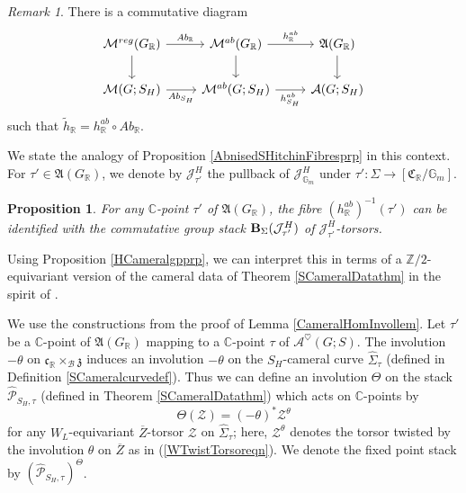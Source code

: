 \documentclass{amsart}
\newtheorem{proposition}[theorem]{Proposition}
\theoremstyle{remark}
\newtheorem{remark}[theorem]{Remark}
\numberwithin{theorem}{section}
\numberwithin{equation}{section}
\begin{document}
\begin{remark}\label{AbnsdGRHiggsrmk}
    There is a commutative diagram
        \begin{equation}\label{AbnsdGRHiggs2eqn}
\begin{tikzcd}
{\mathcal M^{reg}(G_{\mathbb{R}})} \arrow[r, " Ab_\mathbb{R}"] \arrow[d] & {\mathcal M^{ab}(G_{\mathbb{R}})} \arrow[r, "{h}^{ab}_{\mathbb{R}}"] \arrow[d] & {\mathfrak{ A}(G_{\mathbb{R}})} \arrow[d] \\
{\mathcal M(G;{S_H})} \arrow[r, "Ab_{S_H}"']                                             & {\mathcal M^{ab}(G;{S_H})} \arrow[r, "h_{S_H}^{ab}"']                                                   & {\mathcal A(G;S_H)}                
\end{tikzcd}
        \end{equation}
        such that $\tilde{h}_{\mathbb{R}} = { h}_{\mathbb{R}}^{ab} \circ { Ab}_{\mathbb{R}}$.
\end{remark}

We state the analogy of Proposition \ref{AbnisedSHitchinFibresprp} in this context. For $\tau' \in \mathfrak{ A}(G_\mathbb{R})$, we denote by $\mathcal J_{\tau'}^H$ the pullback of $\mathcal J^H_{\mathbb{G}_m}$ under $\tau':\Sigma \rightarrow [\mathfrak{C}_\mathbb{R}/\mathbb{G}_m]$.
\begin{proposition}\label{RealNonAbnAbnprp}
        For any $\mathbb{C}$-point $\tau'$ of $\mathfrak{ A}(G_{\mathbb{R}})$, the fibre $({h}_{\mathbb{R}}^{ab})^{-1}(\tau')$ can be identified with the commutative group stack ${\bf B}_{\Sigma}(\mathcal J^H_{\tau'})$ of $\mathcal J^H_{\tau'}$-torsors.
\end{proposition}

Using Proposition \ref{HCameralgpprp}, we can interpret this in terms of a $\mathbb{Z}/2$-equivariant version of the cameral data of Theorem \ref{SCameralDatathm} in the spirit of \cite[Section 5.2]{GPPN}. 

We use the constructions from the proof of Lemma \ref{CameralHomInvollem}. Let $\tau'$ be a $\mathbb{C}$-point of $\mathfrak{ A}(G_{\mathbb{R}})$ mapping to a $\mathbb{C}$-point $\tau$ of $\mathcal A^\heartsuit(G;S)$. The involution $-\theta$ on $\mathfrak{c}_\mathbb{R} \times_{\mathcal B} \mathfrak{z}$ induces an involution $-\theta$ on the $S_H$-cameral curve $\hat\Sigma_\tau$ (defined in Definition \ref{SCameralcurvedef}). Thus we can define an involution $\Theta$ on the stack $\hat{\mathcal P}_{S_H,\tau}$ (defined in Theorem \ref{SCameralDatathm}) which acts on $\mathbb{C}$-points by 
\begin{equation}\label{CameralDatInvoleqn}
    \Theta(\mathcal Z) = (-\theta)^*\mathcal Z^\theta
\end{equation}
for any $W_L$-equivariant $\overline{Z}$-torsor $\mathcal Z$ on $\hat\Sigma_\tau$; here, $\mathcal Z^\theta$ denotes the torsor twisted by the involution $\theta$ on $\overline{Z}$ as in (\ref{WTwistTorsoreqn}). We denote the fixed point stack by $(\hat{\mathcal P}_{S_H,\tau})^\Theta$.
\end{document}
